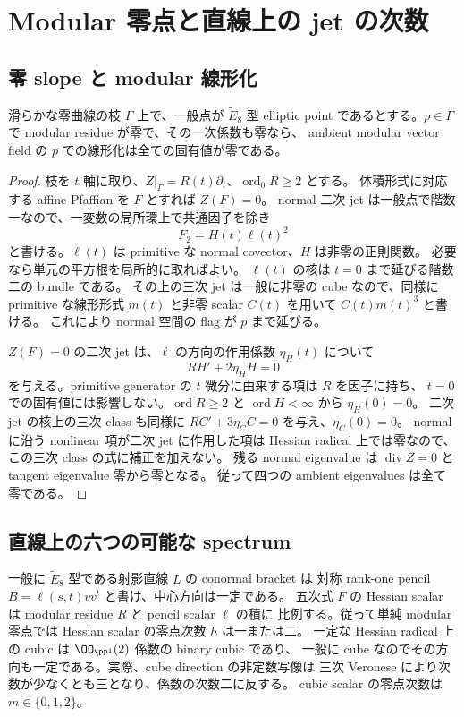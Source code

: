 \section{Modular 零点と直線上の jet の次数}

\subsection{零 slope と modular 線形化}

\begin{lemma}\label{lem:zero-slope-nilpotent}
滑らかな零曲線の枝 $\Gamma$ 上で、一般点が $\widetilde E_8$ 型 elliptic point
であるとする。$p\in\Gamma$ で modular residue が零で、その一次係数も零なら、
ambient modular vector field の $p$ での線形化は全ての固有値が零である。
\end{lemma}

\begin{proof}
枝を $t$ 軸に取り、$Z|_\Gamma=R(t)\partial_t$、$\operatorname{ord}_0R\ge2$ とする。
体積形式に対応する affine Pfaffian を $F$ とすれば $Z(F)=0$。
normal 二次 jet は一般点で階数一なので、一変数の局所環上で共通因子を除き
\[
 F_2=H(t)\ell(t)^2
\]
と書ける。$\ell(t)$ は primitive な normal covector、$H$ は非零の正則関数。
必要なら単元の平方根を局所的に取ればよい。
$\ell(t)$ の核は $t=0$ まで延びる階数二の bundle である。
その上の三次 jet は一般に非零の cube なので、同様に primitive な線形形式
$m(t)$ と非零 scalar $C(t)$ を用いて $C(t)m(t)^3$ と書ける。
これにより normal 空間の flag が $p$ まで延びる。

$Z(F)=0$ の二次 jet は、$\ell$ の方向の作用係数 $\eta_H(t)$ について
\[
 RH'+2\eta_H H=0
\]
を与える。primitive generator の $t$ 微分に由来する項は $R$ を因子に持ち、
$t=0$ での固有値には影響しない。$\operatorname{ord}R\ge2$ と
$\operatorname{ord}H<\infty$ から $\eta_H(0)=0$。
二次 jet の核上の三次 class も同様に
$RC'+3\eta_C C=0$ を与え、$\eta_C(0)=0$。
normal に沿う nonlinear 項が二次 jet に作用した項は Hessian radical 上では零なので、
この三次 class の式に補正を加えない。
残る normal eigenvalue は $\operatorname{div}Z=0$ と tangent eigenvalue 零から零となる。
従って四つの ambient eigenvalues は全て零である。
\end{proof}

\subsection{直線上の六つの可能な spectrum}

一般に $\widetilde E_8$ 型である射影直線 $L$ の conormal bracket は
対称 rank-one pencil $B=\ell(s,t)vv^t$ と書け、中心方向は一定である。
五次式 $F$ の Hessian scalar は modular residue $R$ と pencil scalar $\ell$ の積に
比例する。従って単純 modular 零点では Hessian scalar の零点次数 $h$ は一または二。
一定な Hessian radical 上の cubic は $\OO_{\PP^1}(2)$ 係数の binary cubic であり、
一般に cube なのでその方向も一定である。実際、cube direction の非定数写像は
三次 Veronese により次数が少なくとも三となり、係数の次数二に反する。
cubic scalar の零点次数は $m\in\{0,1,2\}$。

